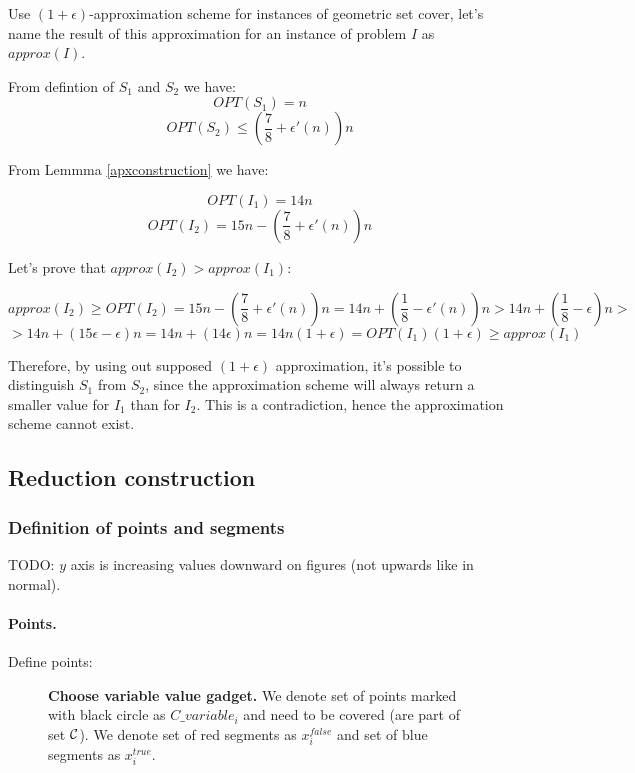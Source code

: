 Use $(1+\epsilon)$-approximation scheme for instances of geometric
set cover, let's name the result of this approximation
for an instance of problem $I$ as $approx(I)$.

From defintion of $S_1$ and $S_2$ we have:
$$OPT(S_1) = n$$
$$OPT(S_2) \le (\frac{7}{8} + \epsilon'(n))n$$

From Lemmma \ref{apxconstruction} we have:

$$OPT(I_1) = 14n$$
$$OPT(I_2) = 15n - (\frac{7}{8} + \epsilon'(n))n$$

Let's prove that $approx(I_2) > approx(I_1)$:

$$approx(I_2) \ge OPT(I_2) = 15n - (\frac{7}{8} + \epsilon'(n))n
	= 14n + (\frac{1}{8} - \epsilon'(n))n
	> 14n + (\frac{1}{8} - \epsilon)n > $$
$$	> 14n + (15\epsilon - \epsilon)n
	= 14n + (14\epsilon)n
	= 14n(1+\epsilon)
	= OPT(I_1)(1+\epsilon) \ge approx(I_1)$$ 



Therefore, by using out supposed $(1+\epsilon)$ approximation,
it’s possible to distinguish $S_1$ from $S_2$, since
the approximation scheme will always return a smaller value
for $I_1$ than for $I_2$. This is a contradiction,
hence the approximation scheme cannot exist.

\subsection{Reduction construction}
\subsubsection{Definition of points and segments}

TODO: $y$ axis is increasing values downward on figures
(not upwards like in normal).

\paragraph{Points.}

Define points:
\begin{figure}[h]
\centering
\def\svgwidth{0.5\columnwidth}

\caption{\textbf{Choose variable value gadget.}
We denote set of points marked with black circle as $C\_variable_i$
and need to be covered (are part of set $\mathcal{C}$).
We denote set of red segments as $x^{false}_i$
and set of blue segments as $x^{true}_i$.}
\label{fig:apx_choose_variable}
\end{figure}

